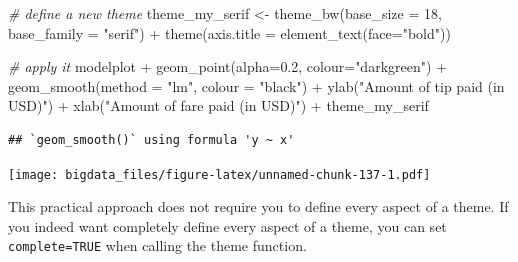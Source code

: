 \documentclass[
  12pt,
]{style/krantz}
\newenvironment{Shaded}{\begin{snugshade}}{\end{snugshade}}
\newcommand{\AttributeTok}[1]{\textcolor[rgb]{0.77,0.63,0.00}{#1}}
\newcommand{\CommentTok}[1]{\textcolor[rgb]{0.56,0.35,0.01}{\textit{#1}}}
\newcommand{\DecValTok}[1]{\textcolor[rgb]{0.00,0.00,0.81}{#1}}
\newcommand{\FloatTok}[1]{\textcolor[rgb]{0.00,0.00,0.81}{#1}}
\newcommand{\FunctionTok}[1]{\textcolor[rgb]{0.00,0.00,0.00}{#1}}
\newcommand{\NormalTok}[1]{#1}
\newcommand{\OtherTok}[1]{\textcolor[rgb]{0.56,0.35,0.01}{#1}}
\newcommand{\SpecialCharTok}[1]{\textcolor[rgb]{0.00,0.00,0.00}{#1}}
\newcommand{\StringTok}[1]{\textcolor[rgb]{0.31,0.60,0.02}{#1}}
\begin{document}
\begin{Shaded}
\begin{Highlighting}[]
\CommentTok{\# \textquotesingle{}define\textquotesingle{} a new theme}
\NormalTok{theme\_my\_serif }\OtherTok{\textless{}{-}}      
  \FunctionTok{theme\_bw}\NormalTok{(}\AttributeTok{base\_size =} \DecValTok{18}\NormalTok{, }\AttributeTok{base\_family =} \StringTok{"serif"}\NormalTok{) }\SpecialCharTok{+}
  \FunctionTok{theme}\NormalTok{(}\AttributeTok{axis.title =} \FunctionTok{element\_text}\NormalTok{(}\AttributeTok{face=}\StringTok{"bold"}\NormalTok{))}

\CommentTok{\# apply it }
\NormalTok{modelplot }\SpecialCharTok{+}
     \FunctionTok{geom\_point}\NormalTok{(}\AttributeTok{alpha=}\FloatTok{0.2}\NormalTok{, }\AttributeTok{colour=}\StringTok{"darkgreen"}\NormalTok{) }\SpecialCharTok{+}
     \FunctionTok{geom\_smooth}\NormalTok{(}\AttributeTok{method =} \StringTok{"lm"}\NormalTok{, }\AttributeTok{colour =} \StringTok{"black"}\NormalTok{) }\SpecialCharTok{+}
     \FunctionTok{ylab}\NormalTok{(}\StringTok{"Amount of tip paid (in USD)"}\NormalTok{) }\SpecialCharTok{+}
     \FunctionTok{xlab}\NormalTok{(}\StringTok{"Amount of fare paid (in USD)"}\NormalTok{) }\SpecialCharTok{+}
\NormalTok{  theme\_my\_serif}
\end{Highlighting}
\end{Shaded}

\begin{verbatim}
## `geom_smooth()` using formula 'y ~ x'
\end{verbatim}

\texttt{[image: bigdata\_files/figure-latex/unnamed-chunk-137-1.pdf]}

This practical approach does not require you to define every aspect of a theme. If you indeed want completely define every aspect of a theme, you can set \texttt{complete=TRUE} when calling the theme function.
\end{document}
